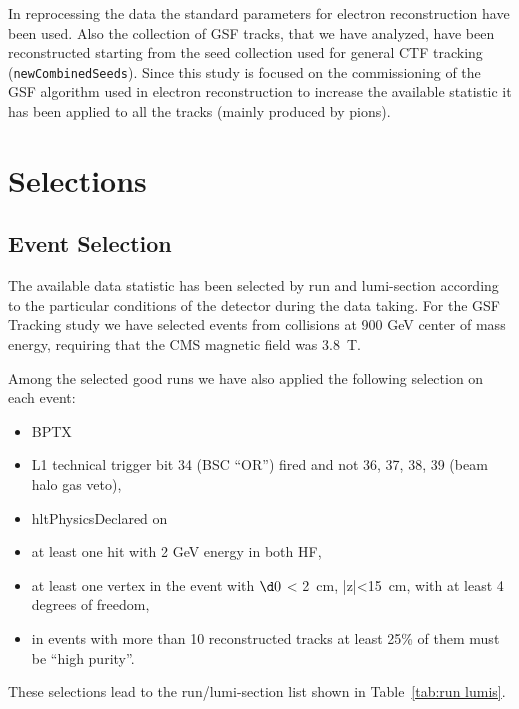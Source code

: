 In reprocessing the data the standard parameters for electron
reconstruction have been used.
Also the collection of GSF tracks, that we have analyzed, have been reconstructed starting from the 
seed collection used for general CTF tracking (\verb=newCombinedSeeds=).
Since this study is focused on the commissioning of the GSF algorithm used in
electron reconstruction to increase the available statistic it has been applied
to all the tracks (mainly produced by pions).

\section{Selections}\label{sec:Selections}

\subsection{Event Selection}
The available data statistic has been selected by run and lumi-section according to the
particular conditions of the detector during the data taking. 
For the GSF Tracking study we have selected events from collisions at 900 GeV
center of mass energy, requiring that the CMS magnetic field was 3.8~T. 

Among the selected good runs we have also applied the following selection on each event:
\begin{itemize}
\item BPTX 
\item L1 technical trigger bit 34 (BSC ``OR'') fired and not 36, 37, 38, 39 (beam halo gas veto),
\item hltPhysicsDeclared on
\item at least one hit with 2 GeV energy in both HF,
\item at least one vertex in the event with $\d0$ < 2~cm, |z|<15~cm, with at least 4 degrees of freedom,
\item in events with more than 10 reconstructed tracks at least 25\%
  of them must be ``high purity''. 
\end{itemize}

These selections lead to the run/lumi-section list shown in Table~\ref{tab:run lumis}.

